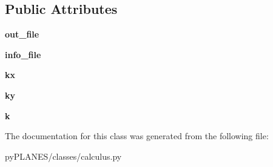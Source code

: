 \subsection*{Public Attributes}
\begin{DoxyCompactItemize}
\item 
\mbox{\label{classpy_p_l_a_n_e_s_1_1classes_1_1calculus_1_1_pw_calculus_a96f5b385ba0181a3a30067966e9f3d26}} 
{\bfseries out\+\_\+file}
\item 
\mbox{\label{classpy_p_l_a_n_e_s_1_1classes_1_1calculus_1_1_pw_calculus_ab3ad52ae651b9fdbd97298b6ac79b469}} 
{\bfseries info\+\_\+file}
\item 
\mbox{\label{classpy_p_l_a_n_e_s_1_1classes_1_1calculus_1_1_pw_calculus_a97449d9b08d3423ae86638c5cd00a477}} 
{\bfseries kx}
\item 
\mbox{\label{classpy_p_l_a_n_e_s_1_1classes_1_1calculus_1_1_pw_calculus_a7de0a4be5a632e163bae9eef123f8781}} 
{\bfseries ky}
\item 
\mbox{\label{classpy_p_l_a_n_e_s_1_1classes_1_1calculus_1_1_pw_calculus_ab2584739426318c07540ac71e8a95a14}} 
{\bfseries k}
\end{DoxyCompactItemize}


The documentation for this class was generated from the following file\+:\begin{DoxyCompactItemize}
\item 
py\+P\+L\+A\+N\+E\+S/classes/calculus.\+py\end{DoxyCompactItemize}
